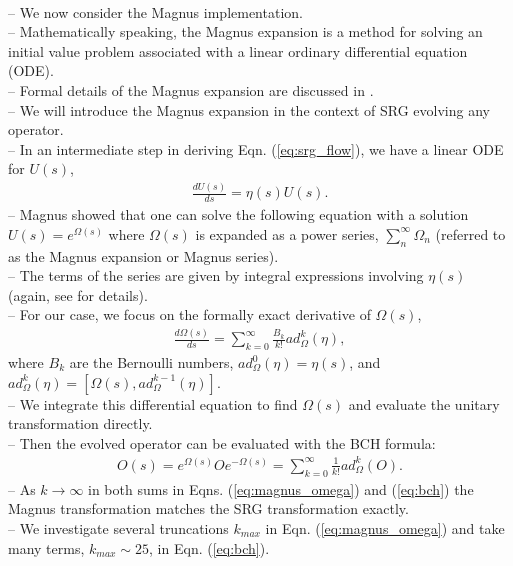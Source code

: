 \documentclass[preprintnumbers,floatfix,aps,prc,preprint,nofootinbib]{revtex4-1}
\begin{document}
\\
-- We now consider the Magnus implementation.
\\
-- Mathematically speaking, the Magnus expansion is a method for solving an initial value problem associated with a linear ordinary differential equation (ODE).
\\
-- Formal details of the Magnus expansion are discussed in \cite{Blanes:2009ab}.
\\
-- We will introduce the Magnus expansion in the context of SRG evolving any operator.
\\
-- In an intermediate step in deriving Eqn. (\ref{eq:srg_flow}), we have a linear ODE for $U(s)$,
%
\begin{eqnarray}
	\label{eq:unitary_trans}
	\frac{dU(s)}{ds} = \eta(s) U(s).
\end{eqnarray}
%
-- Magnus showed that one can solve the following equation with a solution $U(s)=e^{\Omega(s)}$ where $\Omega(s)$ is expanded as a power series, $\sum_{n}^{\infty} \Omega_n$ (referred to as the Magnus expansion or Magnus series).
\\
-- The terms of the series are given by integral expressions involving $\eta(s)$ (again, see \cite{Blanes:2009ab, Magnus:1954zz} for details).
\\
-- For our case, we focus on the formally exact derivative of $\Omega(s)$,
%
\begin{eqnarray}
	\label{eq:magnus_omega}
	\frac{d\Omega(s)}{ds} = \sum_{k=0}^{\infty} \frac{B_k}{k!} ad_{\Omega}^{k}(\eta),
\end{eqnarray}
%
where $B_k$ are the Bernoulli numbers, $ad_{\Omega}^{0}(\eta)=\eta(s)$, and $ad_{\Omega}^{k}(\eta)=[\Omega(s),ad_{\Omega}^{k-1}(\eta)]$.
\\
-- We integrate this differential equation to find $\Omega(s)$ and evaluate the unitary transformation directly.
\\
-- Then the evolved operator can be evaluated with the BCH formula:
%
\begin{eqnarray}
	\label{eq:bch}
	O(s) = e^{\Omega(s)} O e^{-\Omega(s)} = \sum_{k=0}^{\infty} \frac{1}{k!} ad_{\Omega}^{k}(O).
\end{eqnarray}
%
-- As $k \rightarrow \infty$ in both sums in Eqns. (\ref{eq:magnus_omega}) and (\ref{eq:bch}) the Magnus transformation matches the SRG transformation exactly.
\\
-- We investigate several truncations $k_{max}$ in Eqn. (\ref{eq:magnus_omega}) and take many terms, $k_{max} \sim 25$, in Eqn. (\ref{eq:bch}).
\end{document}
